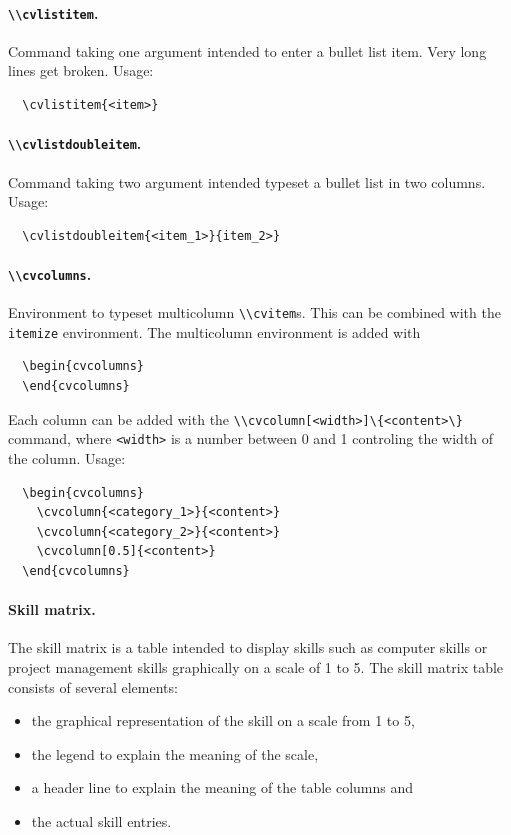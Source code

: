 \documentclass[a4paper, 11pt]{article}
\newcommand{\code}[1]{\lstinline!#1!}
\begin{document}
\paragraph{\code{\\cvlistitem}.}
Command taking one argument intended to enter a bullet list item.
Very long lines get broken.
Usage:
\begin{lstlisting}
  \cvlistitem{<item>}
\end{lstlisting}

\paragraph{\code{\\cvlistdoubleitem}.}
Command taking two argument intended typeset a bullet list in two columns.
Usage:
\begin{lstlisting}
  \cvlistdoubleitem{<item_1>}{item_2>}
\end{lstlisting}

\paragraph{\code{\\cvcolumns}.}
Environment to typeset multicolumn \code{\\cvitem}s.
This can be combined with the \code{itemize} environment.
The multicolumn environment is added with
\begin{lstlisting}
  \begin{cvcolumns}
  \end{cvcolumns}
\end{lstlisting}
Each column can be added with the \code{\\cvcolumn[<width>]\{<content>\}} command, where \code{<width>} is a number between 0 and 1 controling the width of the column.
Usage:
\begin{lstlisting}
  \begin{cvcolumns}
    \cvcolumn{<category_1>}{<content>}
    \cvcolumn{<category_2>}{<content>}
    \cvcolumn[0.5]{<content>}
  \end{cvcolumns}
\end{lstlisting}

\paragraph{Skill matrix.}
The skill matrix is a table intended to display skills such as computer skills or project management skills graphically on a scale of 1 to 5.
The skill matrix table consists of several elements:
\begin{itemize}
  \item the graphical representation of the skill on a scale from 1 to 5,
  \item the legend to explain the meaning of the scale,
  \item a header line to explain the meaning of the table columns and
  \item the actual skill entries.
\end{itemize}
\end{document}
